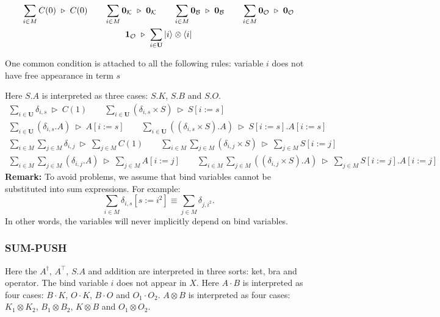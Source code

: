 \documentclass[manuscript, review, timestamp]{acmart}
\newcommand*{\reduce}{\ \triangleright\ }
\begin{document}
\begin{gather*}
  \sum_{i \in M} C(0) \reduce C(0)
  \qquad
  \sum_{i \in M} \mathbf{0}_\mathcal{K} \reduce \mathbf{0}_\mathcal{K}
  \qquad
  \sum_{i \in M} \mathbf{0}_\mathcal{B} \reduce \mathbf{0}_\mathcal{B}
  \qquad
  \sum_{i \in M} \mathbf{0}_\mathcal{O} \reduce \mathbf{0}_\mathcal{O}\\
  \mathbf{1}_\mathcal{O} \reduce \sum_{i \in \mathbf{U}} \ket{i}\otimes\bra{i}
\end{gather*}

One common condition is attached to all the following rules: variable $i$ does not have free appearance in term $s$

Here $S.A$ is interpreted as three cases: $S.K$, $S.B$ and $S.O$.
\begin{gather*}
  \sum_{i \in \mathbf{U}} \delta_{i, s} \reduce C(1)
  \qquad
  \sum_{i \in \mathbf{U}} (\delta_{i, s} \times S) \reduce S[i:=s] \\
  \sum_{i \in \mathbf{U}} (\delta_{i, s}.A) \reduce A[i:=s]
  \qquad
  \sum_{i \in \mathbf{U}} ((\delta_{i, s} \times S).A) \reduce S[i:=s].A[i:=s]
\end{gather*}
\begin{gather*}
  \sum_{i \in M} \sum_{j \in M} \delta_{i, j} \reduce \sum_{j \in M} C(1)
  \qquad
  \sum_{i \in M} \sum_{j \in M} (\delta_{i, j} \times S) \reduce \sum_{j \in M} S[i:=j] \\
  \sum_{i \in M} \sum_{j \in M} (\delta_{i, j}.A) \reduce \sum_{j \in M} A[i:=j]
  \qquad
  \sum_{i \in M} \sum_{j \in M} ((\delta_{i, j} \times S).A) \reduce \sum_{j \in M} S[i:=j].A[i:=j]
\end{gather*}
\textbf{Remark:} To avoid problems, we assume that bind variables cannot be substituted into sum expressions. For example:
$$
\sum_{i \in M} \delta_{i, s}[s:=i^2] \equiv \sum_{j \in M} \delta_{j, i^2}.
$$
In other words, the variables will never implicitly depend on bind variables.

\subsubsection*{\textsf{SUM-PUSH}}

Here the $A^\dagger$, $A^\top$, $S.A$ and addition are interpreted in three sorts: ket, bra and operator.
The bind variable $i$ does not appear in $X$.
Here $A \cdot B$ is interpreted as four cases: $B \cdot K$, $O \cdot K$, $B \cdot O$ and $O_1 \cdot O_2$. $A \otimes B$ is interpreted as four cases: $K_1 \otimes K_2$, $B_1 \otimes B_2$, $K \otimes B$ and $O_1 \otimes O_2$.
\end{document}
